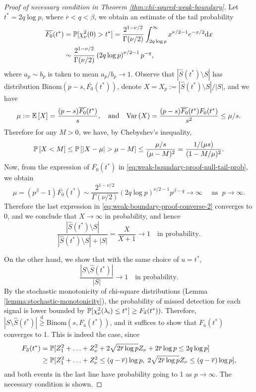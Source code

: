 \begin{proof}[Proof of necessary condition in Theorem \ref{thm:chi-squred-weak-boundary}]
Let $t^* = 2q\log{p}$, where $\overline{r}<q<\beta$, we obtain an estimate of the tail probability
\begin{align}
    \overline{F_0}(t^*) 
    &= \P[\chi_\nu^2(0) > t^*] 
    = \frac{2^{1-\nu/2}}{\Gamma(\nu/2)} \int_{2q\log{p}}^\infty x^{\nu/2-1}e^{-x/2} \mathrm{d}x \nonumber \\
    &\sim \frac{2^{1-\nu/2}}{\Gamma(\nu/2)} \left(2q\log{p}\right)^{\nu/2-1}p^{-q}, \label{eq:weak-boundary-proof-null-tail-prob}
\end{align}
where $a_p\sim b_p$ is taken to mean $a_p/b_p\to 1$.
Observe that $|\widehat{S}(t^*)\setminus{S}|$ has distribution $\text{Binom}(p-s, \overline{F_0}(t^*))$, denote $X = X_p := {|\widehat{S}(t^*)\setminus{S}|}/{|S|}$, and we have 
$$
\mu := \E\left[X\right] = \frac{(p-s)\overline{F_0}(t^*)}{s},
\quad \text{and} \quad
\var\left(X\right) = \frac{(p-s)\overline{F_0}(t^*){F_0}(t^*)}{s^2} \le \mu/s.
$$
Therefore for any $M>0$, we have, by Chebyshev's inequality,
\begin{equation}
    \P\left[X < M\right] 
    \le \P\left[\left|X-\mu\right| > \mu - M\right]
    \le \frac{\mu/s}{(\mu-M)^2}
    = \frac{1/(\mu s)}{(1-M/\mu)^2}. \label{eq:weak-boundary-proof-converse-2}
\end{equation}
Now, from the expression of $\overline{F_0}(t^*)$ in \eqref{eq:weak-boundary-proof-null-tail-prob}, we obtain
$$
\mu = (p^\beta - 1)\overline{F_0}(t^*) \sim \frac{2^{1-\nu/2}}{\Gamma(\nu/2)} \left(2q\log{p}\right)^{\nu/2-1}p^{\beta-q}\to\infty \quad \text{ as }\;p\to\infty.
$$
Therefore the last expression in \eqref{eq:weak-boundary-proof-converse-2} converges to 0, and we conclude that $X\to\infty$ in probability, and hence
$$
\frac{|\widehat{S}(t^*)\setminus{S}|}{|\widehat{S}(t^*)\setminus{S}|+|{S}|} 
= \frac{X}{X+1} \to 1 \quad \text{in probability}.
$$

On the other hand, we show that with the same choice of $u = t^*$,
$$
\frac{|{S}\setminus\widehat{S}(t^*)|}{|{S}|}\to 1 \quad \text{in probability}.
$$
By the stochastic monotonicity of chi-square distributions (Lemma \ref{lemma:stochastic-monotonicity}), the probability of missed detection for each signal is lower bounded by $\P[\chi^2_\nu(\lambda_i) \le t^*] \ge F_{\overline{a}}(t^*))$.
Therefore, $|{S}\setminus\widehat{S}(t^*)| \stackrel{\mathrm{d}}{\ge} \text{Binom}(s, {F_{\overline{a}}}(t^*))$, and it suffices to show that ${F_{\overline{a}}}(t^*)$ converges to 1.
This is indeed the case, since
\begin{align*}
    {F_{\overline{a}}}(t^*) 
    &= \P[Z_1^2 + \ldots + Z_\nu^2 + 2\sqrt{2\overline{r}\log{p}} Z_\nu + 2\overline{r}\log{p} \le 2q\log{p}] \\
    &\ge \P[Z_1^2 + \ldots + Z_\nu^2 \le (q-\overline{r})\log{p}, \; 2\sqrt{2\overline{r}\log{p}} Z_\nu \le (q-\overline{r})\log{p}],
\end{align*}
and both events in the last line have probability going to 1 as $p\to\infty$.
The necessary condition is shown.
\end{proof}

